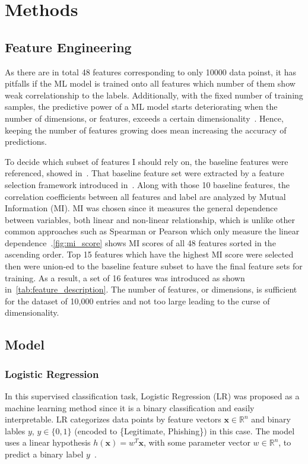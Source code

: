 \section{Methods}\label{sec:method}

\subsection{Feature Engineering}
As there are in total 48 features corresponding to only 10000 data poinst, it has pitfalls
if the ML model is trained onto all features which number of them show weak correlationship to
the labels. Additionally, with the fixed number of training samples, the predictive
power of a ML model starts deteriorating when the number of dimensions, or features, exceeds
a certain dimensionality~\cite{problem-dimension}. Hence, keeping the number of features growing
does mean increasing the accuracy of predictions.

To decide which subset of features I should rely on, the baseline features were referenced,
showed in~\cite{CHIEW2019153}. That baseline feature set were extracted by a feature selection
framework introduced in~\cite{CHIEW2019153}. Along with those 10 baseline features, the correlation
coefficients between all features and label are analyzed by Mutual Information (MI).
MI was chosen since it measures the general dependence between variables, both linear and non-linear
relationship, which is unlike other common approaches such as Spearman or Pearson which only measure
the linear dependence~\cite{MI-score}.\autoref{fig:mi_score} shows MI scores of all 48 features
sorted in the ascending order. Top 15 features which have the highest MI score were selected then were
union-ed to the baseline feature subset to have the final feature sets for training. As a result,
a set of 16 features was introduced as shown in~\autoref{tab:feature_description}. The number of
features, or dimensions, is sufficient for the dataset of 10,000 entries and not too large leading
to the curse of dimensionality.


\subsection{Model}
\subsubsection{Logistic Regression}
In this supervised classification task, Logistic Regression (LR) was proposed as a machine learning method since it
is a binary classification and easily interpretable. LR categorizes data points by feature vectors
$\mathbf{x} \in \mathbb{R}^n$ and binary lables $y$, $y \in \{0,1\}$ (encoded to \{Legitimate, Phishing\}) in this case.
The model uses a linear hypothesis $h(\mathbf{x}) = w^T\mathbf{x}$, with some parameter vector
$w \in \mathbb{R}^n$, to predict a binary label $y$~\cite{ml-book}.

